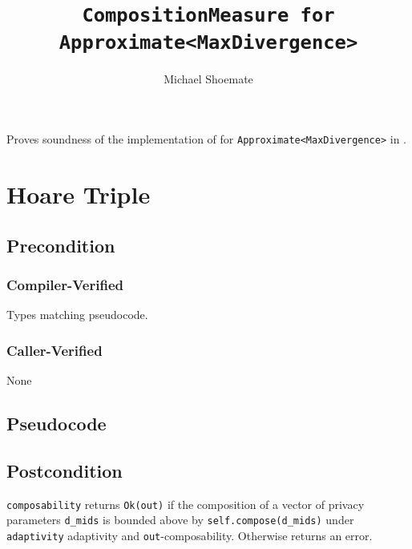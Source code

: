 \documentclass{article}
\title{\texttt{CompositionMeasure for Approximate<MaxDivergence>}}
\author{Michael Shoemate}
\date{}
\begin{document}
\maketitle

\contrib
Proves soundness of the implementation of  
for \texttt{Approximate<MaxDivergence>} in .

\section{Hoare Triple}
\subsection*{Precondition}
\subsubsection*{Compiler-Verified}
Types matching pseudocode.


\subsubsection*{Caller-Verified}
None

\subsection*{Pseudocode}


\subsection*{Postcondition}
\begin{theorem}
  \texttt{composability} returns \texttt{Ok(out)} if the composition of a vector of privacy parameters \texttt{d\_mids} 
  is bounded above by \texttt{self.compose(d\_mids)} under \texttt{adaptivity} adaptivity and \texttt{out}-composability.
  Otherwise returns an error.
\end{theorem}
\end{document}
